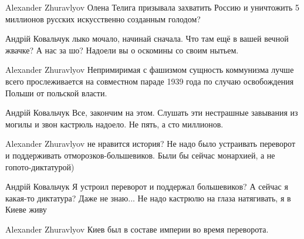 \begin{itemize}

Alexander Zhuravlyov Олена Телига призывала захватить Россию и уничтожить 5
миллионов русских искусственно созданным голодом?


Андрій Ковальчук лыко мочало, начинай сначала. Что там ещё в вашей вечной
жвачке? А нас за шо? Надоели вы о оскомины со своим нытьем.


Alexander Zhuravlyov Непримиримая с фашизмом сущность коммунизма лучше всего
прослеживается на совместном параде 1939 года по случаю освобождения Польши от
польской власти.


Андрій Ковальчук Все, закончим на этом. Слушать эти нестрашные завывания из
могилы и звон кастрюль надоело. Не пять, а сто миллионов.


Alexander Zhuravlyov не нравится история? Не надо было устраивать переворот и
поддерживать отморозков-большевиков. Были бы сейчас монархией, а не
гопото-диктатурой)


Андрій Ковальчук Я устроил переворот и поддержал большевиков? А сейчас я
какая-то диктатура? Даже не знаю... Не надо кастрюлю на глаза натягивать, я в
Киеве живу


Alexander Zhuravlyov Киев был в составе империи во время переворота.
\end{itemize}
